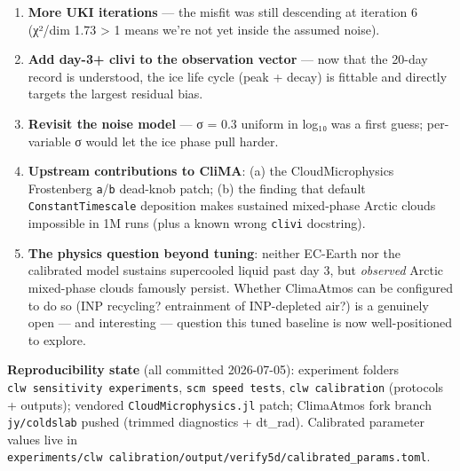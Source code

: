 \documentclass[11pt]{article}
\providecommand{\tightlist}{%
      \setlength{\itemsep}{0pt}\setlength{\parskip}{0pt}}
\begin{document}
\begin{enumerate}
\def\labelenumi{\arabic{enumi}.}
\tightlist
\item
  \textbf{More UKI iterations} --- the misfit was still descending at
  iteration 6 (χ²/dim 1.73 \textgreater{} 1 means we're not yet inside
  the assumed noise).
\item
  \textbf{Add day-3+ clivi to the observation vector} --- now that the
  20-day record is understood, the ice life cycle (peak + decay) is
  fittable and directly targets the largest residual bias.
\item
  \textbf{Revisit the noise model} --- σ = 0.3 uniform in log₁₀ was a
  first guess; per-variable σ would let the ice phase pull harder.
\item
  \textbf{Upstream contributions to CliMA}: (a) the CloudMicrophysics
  Frostenberg \texttt{a}/\texttt{b} dead-knob patch; (b) the finding
  that default \texttt{ConstantTimescale} deposition makes sustained
  mixed-phase Arctic clouds impossible in 1M runs (plus a known wrong
  \texttt{clivi} docstring).
\item
  \textbf{The physics question beyond tuning}: neither EC-Earth nor the
  calibrated model sustains supercooled liquid past day 3, but
  \emph{observed} Arctic mixed-phase clouds famously persist. Whether
  ClimaAtmos can be configured to do so (INP recycling? entrainment of
  INP-depleted air?) is a genuinely open --- and interesting ---
  question this tuned baseline is now well-positioned to explore.
\end{enumerate}

\textbf{Reproducibility state} (all committed 2026-07-05): experiment
folders \texttt{clw\ sensitivity\ experiments},
\texttt{scm\ speed\ tests}, \texttt{clw\ calibration} (protocols +
outputs); vendored \texttt{CloudMicrophysics.jl} patch; ClimaAtmos fork
branch \texttt{jy/coldslab} pushed (trimmed diagnostics + dt\_rad).
Calibrated parameter values live in
\texttt{experiments/clw\ calibration/output/verify5d/calibrated\_params.toml}.


    
    
    
\end{document}
